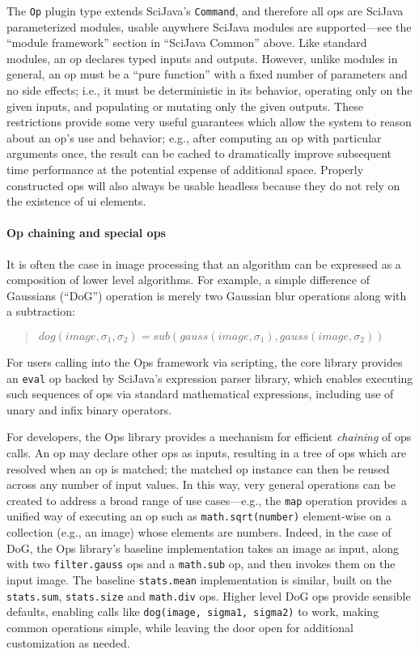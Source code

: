 \documentclass{bmcart}
\begin{document}
The \texttt{Op} plugin type extends SciJava's \texttt{Command}, and therefore
all ops are SciJava parameterized modules, usable anywhere SciJava modules are
supported---see the ``module framework'' section in ``SciJava Common'' above.
Like standard modules, an op declares typed inputs and outputs. However, unlike
modules in general, an op must be a ``pure function'' with a fixed number of
parameters and no side effects; i.e., it must be deterministic in its behavior,
operating only on the given inputs, and populating or mutating only the given
outputs. These restrictions provide some very useful guarantees which allow the
system to reason about an op's use and behavior; e.g., after computing an op
with particular arguments once, the result can be cached to dramatically
improve subsequent time performance at the potential expense of additional
space. Properly constructed ops will also always be usable headless because
they do not rely on the existence of \acrshort{ui} elements.

\paragraph*{Op chaining and special ops}
It is often the case in image processing that an algorithm can be expressed as
a composition of lower level algorithms. For example, a simple difference of
Gaussians (``DoG'') operation is merely two Gaussian blur operations along with
a subtraction:

\begin{quote}
  $dog(image, \sigma_1, \sigma_2) =
  sub(gauss(image, \sigma_1), gauss(image, \sigma_2))$
\end{quote}

For users calling into the Ops framework via scripting, the core library
provides an \texttt{eval} op backed by SciJava's expression parser library,
which enables executing such sequences of ops via standard mathematical
expressions, including use of unary and infix binary operators.

For developers, the Ops library provides a mechanism for efficient
\textit{chaining} of ops calls. An op may declare other ops as inputs,
resulting in a tree of ops which are resolved when an op is matched; the
matched op instance can then be reused across any number of input values. In
this way, very general operations can be created to address a broad range of
use cases---e.g., the \texttt{map} operation provides a unified way of
executing an op such as \texttt{math.sqrt(number)} element-wise on a collection
(e.g., an image) whose elements are numbers. Indeed, in the case of DoG, the
Ops library's baseline implementation takes an image as input, along with two
\texttt{filter.gauss} ops and a \texttt{math.sub} op, and then invokes them on
the input image. The baseline \texttt{stats.mean} implementation is similar,
built on the \texttt{stats.sum}, \texttt{stats.size} and \texttt{math.div} ops.
Higher level DoG ops provide sensible defaults, enabling calls like
\texttt{dog(image, sigma1, sigma2)} to work, making common operations simple,
while leaving the door open for additional customization as needed.
\end{document}
